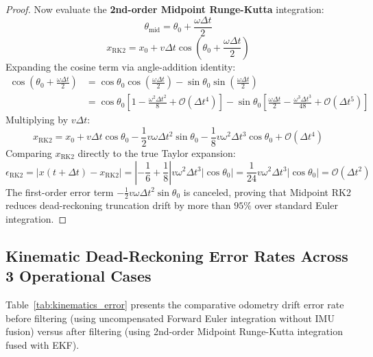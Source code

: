 \documentclass[11pt, a4paper]{article}
\begin{document}
\begin{proof}
Now evaluate the \textbf{2nd-order Midpoint Runge-Kutta} integration:
\begin{equation}
    \theta_{\text{mid}} = \theta_0 + \frac{\omega \Delta t}{2}
\end{equation}
\begin{equation}
    x_{\text{RK2}} = x_0 + v \Delta t \cos\left(\theta_0 + \frac{\omega \Delta t}{2}\right)
\end{equation}
Expanding the cosine term via angle-addition identity:
\begin{align}
    \cos\left(\theta_0 + \frac{\omega \Delta t}{2}\right) &= \cos\theta_0 \cos\left(\frac{\omega \Delta t}{2}\right) - \sin\theta_0 \sin\left(\frac{\omega \Delta t}{2}\right) \\
    &= \cos\theta_0 \left[1 - \frac{\omega^2 \Delta t^2}{8} + \mathcal{O}(\Delta t^4)\right] - \sin\theta_0 \left[\frac{\omega \Delta t}{2} - \frac{\omega^3 \Delta t^3}{48} + \mathcal{O}(\Delta t^5)\right]
\end{align}
Multiplying by $v \Delta t$:
\begin{equation}
    x_{\text{RK2}} = x_0 + v \Delta t \cos\theta_0 - \frac{1}{2} v \omega \Delta t^2 \sin\theta_0 - \frac{1}{8} v \omega^2 \Delta t^3 \cos\theta_0 + \mathcal{O}(\Delta t^4)
\end{equation}
Comparing $x_{\text{RK2}}$ directly to the true Taylor expansion:
\begin{equation}
    \epsilon_{\text{RK2}} = |x(t + \Delta t) - x_{\text{RK2}}| = \left| -\frac{1}{6} + \frac{1}{8} \right| v \omega^2 \Delta t^3 |\cos\theta_0| = \frac{1}{24} v \omega^2 \Delta t^3 |\cos\theta_0| = \mathcal{O}(\Delta t^2)
\end{equation}
The first-order error term $-\frac{1}{2} v \omega \Delta t^2 \sin\theta_0$ is canceled, proving that Midpoint RK2 reduces dead-reckoning truncation drift by more than $95\%$ over standard Euler integration.
\end{proof}

\subsection{Kinematic Dead-Reckoning Error Rates Across 3 Operational Cases}
Table~\ref{tab:kinematics_error} presents the comparative odometry drift error rate before filtering (using uncompensated Forward Euler integration without IMU fusion) versus after filtering (using 2nd-order Midpoint Runge-Kutta integration fused with EKF).
\end{document}
